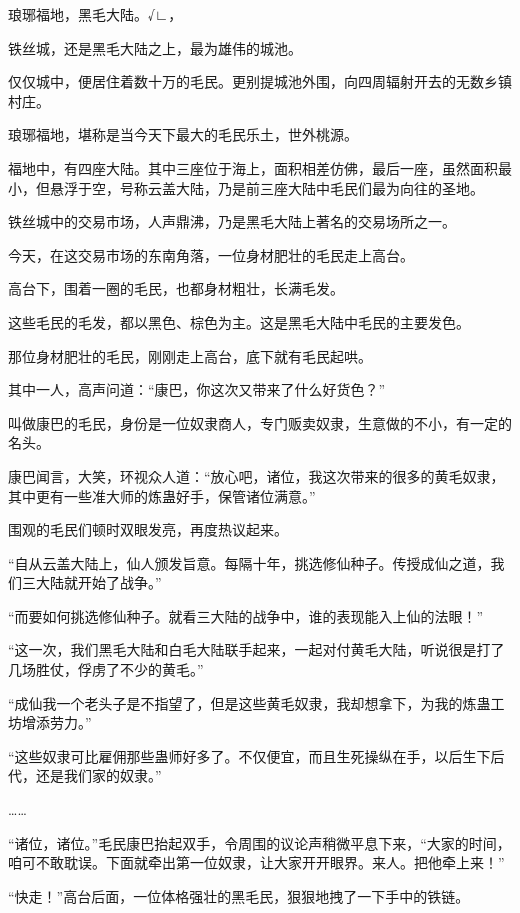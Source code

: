 
\begin{this_body}

琅琊福地，黑毛大陆。√∟，

铁丝城，还是黑毛大陆之上，最为雄伟的城池。

仅仅城中，便居住着数十万的毛民。更别提城池外围，向四周辐射开去的无数乡镇村庄。

琅琊福地，堪称是当今天下最大的毛民乐土，世外桃源。

福地中，有四座大陆。其中三座位于海上，面积相差仿佛，最后一座，虽然面积最小，但悬浮于空，号称云盖大陆，乃是前三座大陆中毛民们最为向往的圣地。

铁丝城中的交易市场，人声鼎沸，乃是黑毛大陆上著名的交易场所之一。

今天，在这交易市场的东南角落，一位身材肥壮的毛民走上高台。

高台下，围着一圈的毛民，也都身材粗壮，长满毛发。

这些毛民的毛发，都以黑色、棕色为主。这是黑毛大陆中毛民的主要发色。

那位身材肥壮的毛民，刚刚走上高台，底下就有毛民起哄。

其中一人，高声问道：“康巴，你这次又带来了什么好货色？”

叫做康巴的毛民，身份是一位奴隶商人，专门贩卖奴隶，生意做的不小，有一定的名头。

康巴闻言，大笑，环视众人道：“放心吧，诸位，我这次带来的很多的黄毛奴隶，其中更有一些准大师的炼蛊好手，保管诸位满意。”

围观的毛民们顿时双眼发亮，再度热议起来。

“自从云盖大陆上，仙人颁发旨意。每隔十年，挑选修仙种子。传授成仙之道，我们三大陆就开始了战争。”

“而要如何挑选修仙种子。就看三大陆的战争中，谁的表现能入上仙的法眼！”

“这一次，我们黑毛大陆和白毛大陆联手起来，一起对付黄毛大陆，听说很是打了几场胜仗，俘虏了不少的黄毛。”

“成仙我一个老头子是不指望了，但是这些黄毛奴隶，我却想拿下，为我的炼蛊工坊增添劳力。”

“这些奴隶可比雇佣那些蛊师好多了。不仅便宜，而且生死操纵在手，以后生下后代，还是我们家的奴隶。”

……

“诸位，诸位。”毛民康巴抬起双手，令周围的议论声稍微平息下来，“大家的时间，咱可不敢耽误。下面就牵出第一位奴隶，让大家开开眼界。来人。把他牵上来！”

“快走！”高台后面，一位体格强壮的黑毛民，狠狠地拽了一下手中的铁链。


\end{this_body}
